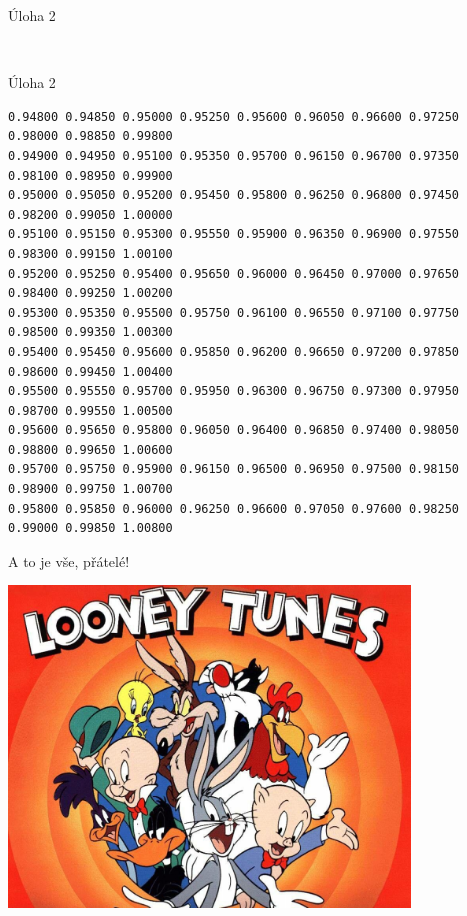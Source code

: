 \documentclass{beamer}
\begin{document}
\begin{frame}[fragile]{Úloha 2}
    \scriptsize
\begin{verbatim}


\end{verbatim}
\end{frame}


\begin{frame}[fragile]{Úloha 2}
    \scriptsize
\begin{verbatim}
0.94800 0.94850 0.95000 0.95250 0.95600 0.96050 0.96600 0.97250 0.98000 0.98850 0.99800
0.94900 0.94950 0.95100 0.95350 0.95700 0.96150 0.96700 0.97350 0.98100 0.98950 0.99900
0.95000 0.95050 0.95200 0.95450 0.95800 0.96250 0.96800 0.97450 0.98200 0.99050 1.00000
0.95100 0.95150 0.95300 0.95550 0.95900 0.96350 0.96900 0.97550 0.98300 0.99150 1.00100
0.95200 0.95250 0.95400 0.95650 0.96000 0.96450 0.97000 0.97650 0.98400 0.99250 1.00200
0.95300 0.95350 0.95500 0.95750 0.96100 0.96550 0.97100 0.97750 0.98500 0.99350 1.00300
0.95400 0.95450 0.95600 0.95850 0.96200 0.96650 0.97200 0.97850 0.98600 0.99450 1.00400
0.95500 0.95550 0.95700 0.95950 0.96300 0.96750 0.97300 0.97950 0.98700 0.99550 1.00500
0.95600 0.95650 0.95800 0.96050 0.96400 0.96850 0.97400 0.98050 0.98800 0.99650 1.00600
0.95700 0.95750 0.95900 0.96150 0.96500 0.96950 0.97500 0.98150 0.98900 0.99750 1.00700
0.95800 0.95850 0.96000 0.96250 0.96600 0.97050 0.97600 0.98250 0.99000 0.99850 1.00800
\end{verbatim}
\end{frame}


\begin{frame}{A to je vše, přátelé!}
  \begin{center}
    \includegraphics[width=0.8\textwidth]{looney_tunes}
  \end{center}
\end{frame}
\end{document}
